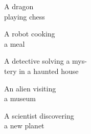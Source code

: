 \begin{figure*}[]
\begin{minipage}[t]{.025\textwidth}
     \vspace{0pt}
\end{minipage}%
\hspace{1ex}%
\begin{minipage}[t]{0.98\figwidth}
    \vspace{1mm}
    \begin{minipage}[t]{0.2\textwidth}
        \centering
        A dragon\\playing chess
    \end{minipage}%
    \begin{minipage}[t]{0.175\textwidth}
        \centering
        A robot cooking\\a meal
    \end{minipage}%
    \begin{minipage}[t]{0.25\textwidth}
        \centering 
        A detective solving a mys-\\tery in a haunted house
    \end{minipage}%
    \begin{minipage}[t]{0.175\textwidth}
        \centering
        An alien visiting\\a museum
    \end{minipage}%
    \begin{minipage}[t]{0.2\textwidth}
        \centering
        A scientist discovering\\a new planet
    \end{minipage}%
\end{minipage}


\end{figure*}
